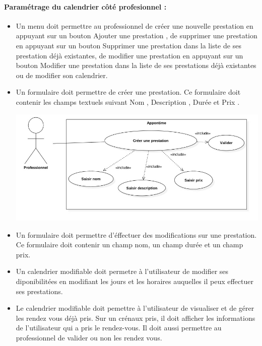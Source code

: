 \documentclass{article}
\begin{document}
\paragraph{Paramétrage du calendrier côté profesionnel :}
\begin{itemize}
\item Un menu doit permettre au professionnel de créer une nouvelle
  prestation en appuyant sur un bouton \og Ajouter une prestation \fg{}, de
  supprimer une prestation en appuyant sur un bouton \og Supprimer une
  prestation \fg{} dans la liste de ses prestation déjà existantes, de modifier une prestation en appuyant sur un
  bouton \og Modifier une prestation \fg{} dans la liste de ses
  prestations déjà existantes
  ou de modifier son calendrier. 
\item Un formulaire doit permettre de créer une prestation. Ce
  formulaire doit contenir les champs textuels suivant \og Nom \fg{}, \og Description
 \fg{},  \og Durée \fg{} et \og Prix \fg{}.  

\includegraphics[scale=0.5]{ShematDiagrammes/useCaseCreerPrestation.jpg}

\item Un formulaire doit permettre d'éffectuer des modifications sur
  une prestation. Ce formulaire doit contenir un champ nom, un champ
  durée et un champ prix.  
\item Un calendrier modifiable doit permetre à l'utilisateur de
  modifier ses diponibilitées en modifiant les jours et les horaires
  auquelles il peux effectuer ses prestations.
\item Le calendrier modifiable doit pemettre à l'utilisateur de
  visualiser et de gérer les rendez vous déjà pris. Sur un crénaux
  pris, il doit afficher les informations de l'utilisateur qui a pris
  le rendez-vous. Il doit aussi permettre au professionnel de valider
  ou non les rendez vous. 
\end{itemize}
\end{document}
